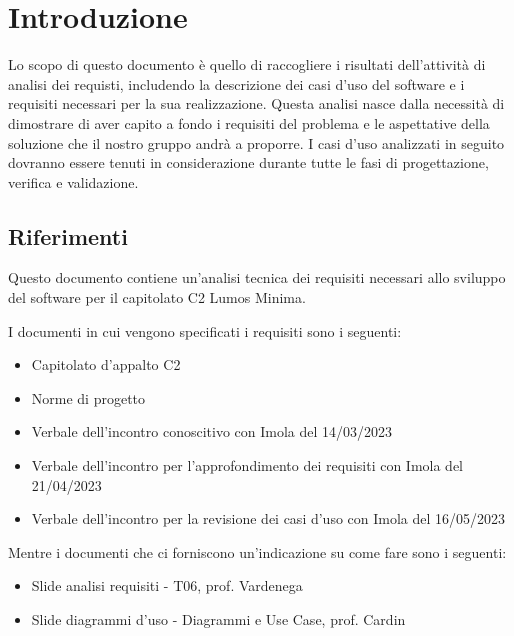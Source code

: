 \documentclass[12pt]{article}
\begin{document}
\section{Introduzione}
Lo scopo di questo documento è quello di raccogliere i risultati dell'attività di analisi dei requisti, includendo la descrizione dei casi d'uso del software e i requisiti necessari per la sua realizzazione.
Questa analisi nasce dalla necessità di dimostrare di aver capito a fondo i requisiti del problema e le aspettative della soluzione che il nostro gruppo andrà a proporre.
I casi d'uso analizzati in seguito dovranno essere tenuti in considerazione durante tutte le fasi di progettazione, verifica e validazione.

\subsection{Riferimenti}
Questo documento contiene un'analisi tecnica dei requisiti necessari allo sviluppo del software per il capitolato C2 Lumos Minima.

I documenti in cui vengono specificati i requisiti sono i seguenti:
\begin{itemize}
	\item Capitolato d'appalto C2
	\item Norme di progetto
	\item Verbale dell'incontro conoscitivo con Imola del 14/03/2023
	\item Verbale dell'incontro per l'approfondimento dei requisiti con Imola del 21/04/2023
	\item Verbale dell'incontro per la revisione dei casi d'uso con Imola del 16/05/2023
\end{itemize}

Mentre i documenti che ci forniscono un'indicazione su come fare sono i seguenti:
\begin{itemize}
	\item Slide analisi requisiti - T06, prof. Vardenega
	\item Slide diagrammi d'uso - Diagrammi e Use Case, prof. Cardin
\end{itemize}
\end{document}
